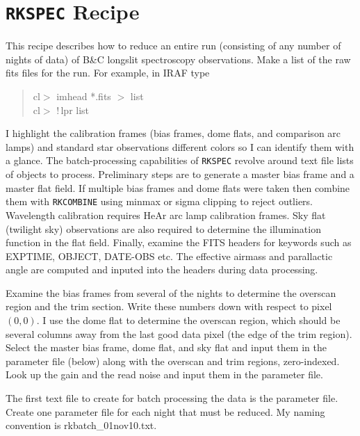 \documentclass[12pt,preprint]{aastex}
\begin{document}
\clearpage

\section*{{\tt RKSPEC} Recipe}

This recipe describes how to reduce an entire run (consisting of any
number of nights of data) of B\&C longslit spectroscopy observations.
Make a list of the raw fits files for the run.  For example, in IRAF
type

\begin{quote}
cl$>$ imhead *.fits $>$ list \\
cl$>$ !\,lpr list
\end{quote}

\noindent I highlight the calibration frames (bias frames, dome flats,
and comparison arc lamps) and standard star observations different
colors so I can identify them with a glance.  The batch-processing
capabilities of {\tt RKSPEC} revolve around text file lists of objects
to process.  Preliminary steps are to generate a master bias frame and
a master flat field.  If multiple bias frames and dome flats were
taken then combine them with {\tt RKCOMBINE} using minmax or sigma
clipping to reject outliers.  Wavelength calibration requires HeAr arc
lamp calibration frames.  Sky flat (twilight sky) observations are
also required to determine the illumination function in the flat
field.  Finally, examine the FITS headers for keywords such as
EXPTIME, OBJECT, DATE-OBS etc.  The effective airmass and parallactic
angle are computed and inputed into the headers during data
processing.

Examine the bias frames from several of the nights to determine the
overscan region and the trim section.  Write these numbers down with
respect to pixel $(0,0)$.  I use the dome flat to determine the
overscan region, which should be several columns away from the last
good data pixel (the edge of the trim region).  Select the master bias
frame, dome flat, and sky flat and input them in the parameter file
(below) along with the overscan and trim regions, zero-indexed.  Look
up the gain and the read noise and input them in the parameter file.

The first text file to create for batch processing the data is the
parameter file.  Create one parameter file for each night that must be
reduced.  My naming convention is rkbatch\_01nov10.txt.
\end{document}
